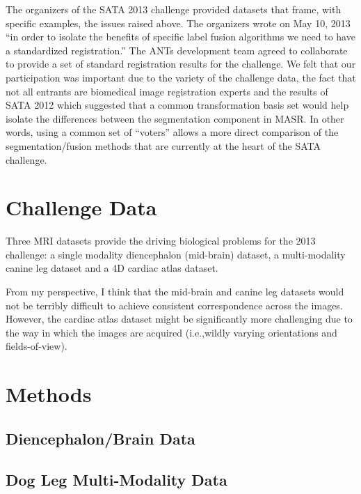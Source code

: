 \documentclass{llncs}
\begin{document}
The organizers of the SATA 2013 challenge provided datasets that
frame, with specific examples, the issues raised above.  The
organizers wrote on May 10, 2013 ``in order to isolate the benefits of
specific label fusion algorithms we need to have a standardized
registration.''  The ANTs development team agreed to collaborate to
provide a set of standard registration results for the challenge.  We
felt that our participation was important due to the variety of the challenge
data, the fact that not all entrants are biomedical image registration
experts and the results of SATA 2012 which suggested that a common
transformation basis set would help isolate the differences between
the segmentation component in MASR.  In other words, using a common
set of ``voters'' allows a more direct comparison of the
segmentation/fusion methods that are currently at the heart of the
SATA challenge.


\section{Challenge Data}
Three MRI datasets provide the driving biological problems for the 2013
challenge: a single modality diencephalon (mid-brain) dataset, a
multi-modality canine leg dataset and a 4D cardiac atlas dataset.  

From my perspective, I think that the mid-brain and canine leg datasets would not be terribly difficult to achieve consistent correspondence across the images. However, the cardiac atlas dataset might be significantly more challenging due to the way in which the images are acquired (i.e.,wildly varying orientations and fields-of-view).

\section{Methods}

\subsection{Diencephalon/Brain Data}

\subsection{Dog Leg Multi-Modality Data}
\end{document}
